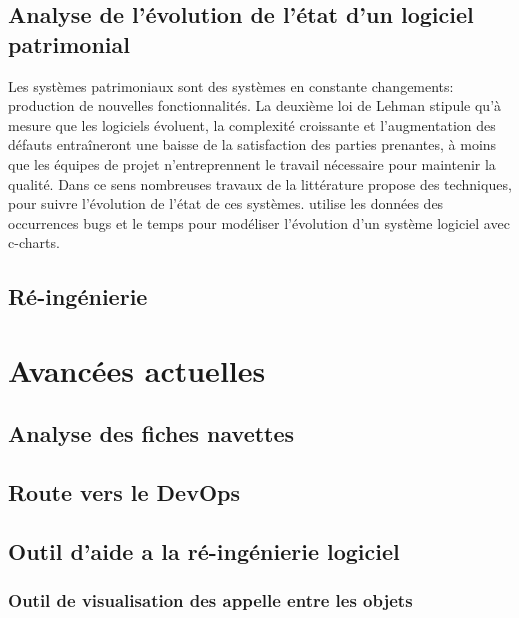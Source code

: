 \documentclass[a4paper]{article}
\begin{document}
\subsection{Analyse de l'évolution de l'état d'un logiciel patrimonial}
\label{sec:etatLogiciel}

Les systèmes  patrimoniaux sont des systèmes en constante changements: production de nouvelles fonctionnalités.
 La deuxième loi de Lehman \cite{Lehm96a} stipule qu'à mesure que les logiciels évoluent, la complexité croissante et l'augmentation des défauts entraîneront une baisse de la satisfaction des parties prenantes, à moins que les équipes de projet n'entreprennent le travail nécessaire pour maintenir la qualité.
 Dans ce sens nombreuses travaux de la littérature propose des techniques, pour suivre l'évolution de l'état de  ces systèmes.
\citep{Zhan10a} utilise les données des occurrences bugs et le temps pour modéliser l'évolution d'un système logiciel avec  c-charts.


 
\subsection{Ré-ingénierie}
\label{sec:decouperGrosseClasse}

\section{Avancées actuelles}

\subsection{Analyse des fiches navettes}
\label{sec:analyseDesFichesNavettes}

\subsection{Route vers le DevOps}
\label{sec: devOps}

\subsection{Outil d'aide a la ré-ingénierie logiciel}

\subsubsection{Outil de visualisation des appelle entre les objets }
\end{document}
